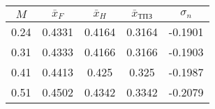 \begin{tabular}{|c|c|c|c|c|}
\hline
$M$ & $\bar{x}_{F}$ & $\bar{x}_{H}$ & $\bar{x}_{ТПЗ}$ & $\sigma_{n}$ \\ 
\hline
0.24 & 0.4331 & 0.4164 & 0.3164 & -0.1901 \\ 
\hline
0.31 & 0.4333 & 0.4166 & 0.3166 & -0.1903 \\ 
\hline
0.41 & 0.4413 & 0.425 & 0.325 & -0.1987 \\ 
\hline
0.51 & 0.4502 & 0.4342 & 0.3342 & -0.2079 \\ 
\hline
\end{tabular}